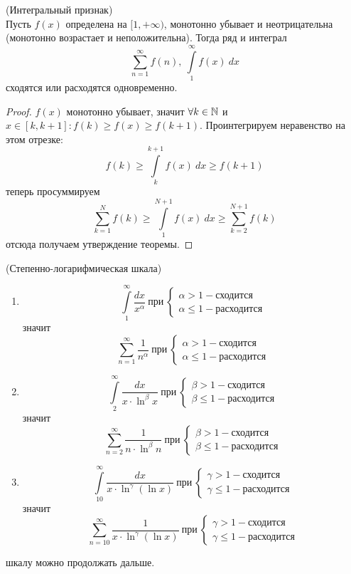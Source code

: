 \begin{theorem} (Интегральный признак) \\
    Пусть $f(x)$ определена на $[1,+\infty)$, монотонно убывает и неотрицательна (монотонно возрастает и неположительна). Тогда ряд и интеграл
    \[\sum_{n=1}^{\infty}f(n),\ \int\limits_{1}^{\infty}f(x)\ dx\]
    сходятся или расходятся одновременно.
\end{theorem}
\begin{proof}
    $f(x)$ монотонно убывает, значит $\forall k\in \mathbb{N}$ и $x\in [k, k+1]: f(k)\geq f(x)\geq f(k+1)$. Проинтегрируем неравенство на этом отрезке:
    \[f(k)\geq \int\limits_{k}^{k+1}f(x)\ dx\geq f(k+1)\]
    теперь просуммируем
    \[\sum_{k=1}^{N}f(k)\geq \int\limits_{1}^{N+1}f(x)\ dx\geq \sum_{k=2}^{N+1}f(k)\]
    отсюда получаем утверждение теоремы.
\end{proof}
\begin{example}(Степенно-логарифмическая шкала)
    \begin{enumerate}
        \item 
    \[\int\limits_{1}^{\infty}\frac{dx}{x^{\alpha}}\ \text{при}\ 
    \begin{cases}
        \alpha>1 - \text{сходится}\\
        \alpha\leq 1 - \text{расходится}
    \end{cases}\]
    значит
    \[\sum_{n=1}^{\infty}\frac{1}{n^{\alpha}}\ \text{при}\ 
    \begin{cases}
        \alpha>1 - \text{сходится}\\
        \alpha\leq 1 - \text{расходится}
    \end{cases}\]
    \item
    \[\int\limits_{2}^{\infty}\frac{dx}{x\cdot \ln^{\beta}{x}}\ \text{при}\ 
    \begin{cases}
        \beta>1 - \text{сходится}\\
        \beta\leq 1 - \text{расходится}
    \end{cases}\]
    значит
    \[\sum_{n=2}^{\infty}\frac{1}{n\cdot \ln^{\beta}{n}}\ \text{при}\ 
    \begin{cases}
        \beta>1 - \text{сходится}\\
        \beta\leq 1 - \text{расходится}
    \end{cases}\]
    \item
    \[\int\limits_{10}^{\infty}\frac{dx}{x\cdot \ln^{\gamma}{(\ln{x})}}\ \text{при}\ 
    \begin{cases}
        \gamma>1 - \text{сходится}\\
        \gamma\leq 1 - \text{расходится}
    \end{cases}\]
    значит
    \[\sum_{n=10}^{\infty}\frac{1}{x\cdot \ln^{\gamma}({\ln{x}})}\ \text{при}\ 
    \begin{cases}
        \gamma>1 - \text{сходится}\\
        \gamma\leq 1 - \text{расходится}
    \end{cases}\]
    \end{enumerate}
    шкалу можно продолжать дальше.
\end{example}
